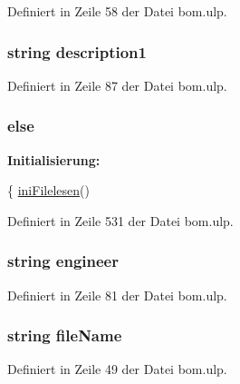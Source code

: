 Definiert in Zeile 58 der Datei bom.\+ulp.

\hypertarget{bom_8ulp_a64ec71ee637d23d7673aeb78fb756b69}{}
\subsubsection[{description1}]{\setlength{\rightskip}{0pt plus 5cm}string description1}\label{bom_8ulp_a64ec71ee637d23d7673aeb78fb756b69}


Definiert in Zeile 87 der Datei bom.\+ulp.

\hypertarget{bom_8ulp_a0544c3fe466e421738dae463968b70ba}{}
\subsubsection[{else}]{\setlength{\rightskip}{0pt plus 5cm}else}\label{bom_8ulp_a0544c3fe466e421738dae463968b70ba}
{\bfseries Initialisierung\+:}
\begin{DoxyCode}
\{
    \hyperlink{bom_8ulp_a5155b4a449afb07c498f38fcc879cb9d}{iniFilelesen}()
\end{DoxyCode}


Definiert in Zeile 531 der Datei bom.\+ulp.

\hypertarget{bom_8ulp_a631ee32a616cc0d4795fdaeacb8a01a8}{}
\subsubsection[{engineer}]{\setlength{\rightskip}{0pt plus 5cm}string engineer}\label{bom_8ulp_a631ee32a616cc0d4795fdaeacb8a01a8}


Definiert in Zeile 81 der Datei bom.\+ulp.

\hypertarget{bom_8ulp_a71f006e8d6ac2a5d94354155a0da69f8}{}
\subsubsection[{file\+Name}]{\setlength{\rightskip}{0pt plus 5cm}string file\+Name}\label{bom_8ulp_a71f006e8d6ac2a5d94354155a0da69f8}


Definiert in Zeile 49 der Datei bom.\+ulp.

